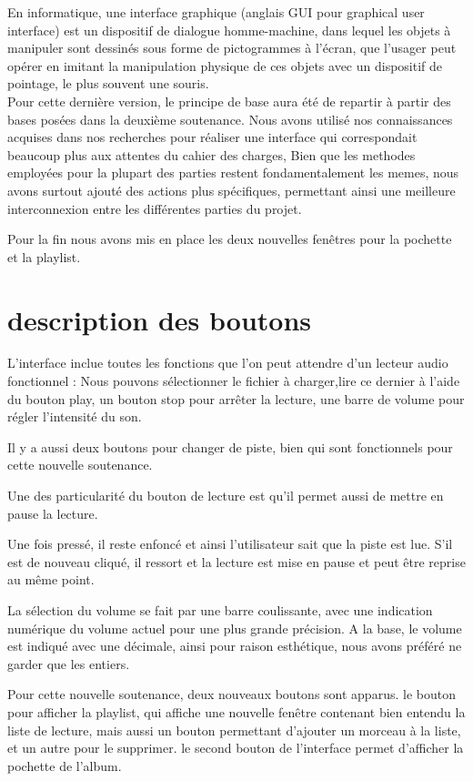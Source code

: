 \documentclass[12pt,a4paper]{report}
\begin{document}
En informatique, une interface graphique (anglais GUI pour graphical user interface) est un dispositif de dialogue homme-machine, dans lequel les objets à manipuler sont dessinés sous forme de pictogrammes à l'écran, que l'usager peut opérer en imitant la manipulation physique de ces objets avec un dispositif de pointage, le plus souvent une souris.\\

Pour cette dernière version, le principe de base aura été de repartir à
partir des bases posées dans la deuxième soutenance. Nous avons utilisé nos connaissances acquises dans nos recherches pour réaliser une interface qui correspondait beaucoup plus aux attentes du cahier des charges, Bien que les methodes employées pour la plupart des parties restent fondamentalement les memes, nous avons surtout ajouté des actions plus spécifiques, permettant ainsi une meilleure interconnexion entre les différentes parties du projet.

Pour la fin nous avons mis en place les deux nouvelles fenêtres pour la pochette et la playlist.

\section{description des boutons}

L'interface inclue toutes les fonctions que l'on peut attendre d'un lecteur
audio fonctionnel : 
Nous pouvons sélectionner le fichier à charger,lire ce dernier à l'aide du bouton play, un bouton stop pour arrêter la lecture, une barre de volume pour régler l'intensité du son.

 Il y a aussi deux boutons pour changer de piste, bien qui sont fonctionnels pour cette nouvelle soutenance.

Une des particularité du bouton de lecture est qu'il permet aussi de mettre
en pause la lecture.

 Une fois pressé, il reste enfoncé et ainsi l'utilisateur sait que la piste est lue. S'il est de nouveau cliqué, il ressort et la lecture est mise en pause et peut être reprise au même point.

La sélection du volume se fait par une barre coulissante, avec une indication
numérique du volume actuel pour une plus grande précision. A la base,
le volume est indiqué avec une décimale, ainsi pour raison esthétique, nous
avons préféré ne garder que les entiers.

Pour cette nouvelle soutenance, deux nouveaux boutons sont apparus.  le bouton pour afficher la playlist, qui affiche une nouvelle fenêtre contenant bien entendu la liste de lecture, mais aussi un bouton permettant d'ajouter un morceau à la liste, et un autre pour le supprimer.
le second bouton de l'interface permet d'afficher la pochette de l'album.
\end{document}

